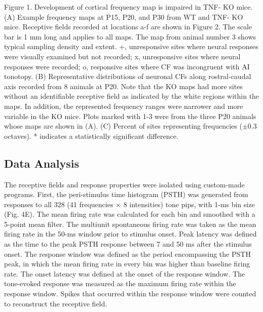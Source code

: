 \begin{changemargin}{1in}{1in}
\footnotesize{Figure 1. Development of cortical frequency map is impaired in TNF-\textalpha{} KO mice. (A) Example frequency maps at P15, P20, and P30 from WT and TNF-\textalpha{} KO mice. Receptive fields recorded at locations a-f are shown in Figure 2. The scale bar is 1 mm long and applies to all maps. The map from animal number 3 shows typical sampling density and extent. +, unresponsive sites where neural responses were visually examined but not recorded; x, unresponsive sites where neural responses were recorded; o, responsive sites where CF was incongruent with AI tonotopy. (B) Representative distributions of neuronal CFs along rostral-caudal axis recorded from 8 animals at P20. Note that the KO maps had more sites without an identifiable receptive field as indicated by the white regions within the maps. In addition, the represented frequency ranges were narrower and more variable in the KO mice. Plots marked with 1-3 were from the three P20 animals whose maps are shown in (A). (C) Percent of sites representing frequencies ($\pm0.3$ octaves). * indicates a statistically significant difference.}
\end{changemargin}

\subsection{Data Analysis}

The receptive fields and response properties were isolated using custom-made programs. First, the peri-stimulus time histogram (PSTH) was generated from responses to all 328 (41 frequencies $\times$ 8 intensities) tone pips, with 1-ms bin size (Fig. 4E). The mean firing rate was calculated for each bin and smoothed with a 5-point mean filter. The multiunit spontaneous firing rate was taken as the mean firing rate in the 50-ms window prior to stimulus onset. Peak latency was defined as the time to the peak PSTH response between 7 and 50 ms after the stimulus onset. The response window was defined as the period encompassing the PSTH peak, in which the mean firing rate in every bin was higher than baseline firing rate. The onset latency was defined at the onset of the response window. The tone-evoked response was measured as the maximum firing rate within the response window. Spikes that occurred within the response window were counted to reconstruct the receptive field.


